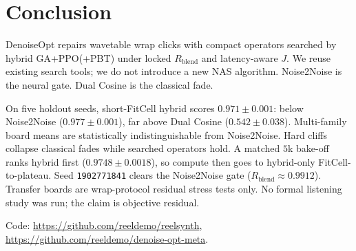 \section{Conclusion}
\label{sec:conclusion}

DenoiseOpt repairs wavetable wrap clicks with compact operators searched by hybrid GA+PPO(+PBT) under locked $R_{\mathrm{blend}}$ and latency-aware $J$.
We reuse existing search tools; we do not introduce a new NAS algorithm.
Noise2Noise is the neural gate. Dual Cosine is the classical fade.

On five holdout seeds, short-FitCell hybrid scores $0.971{\pm}0.001$: below Noise2Noise ($0.977{\pm}0.001$), far above Dual Cosine ($0.542{\pm}0.038$).
Multi-family board means are statistically indistinguishable from Noise2Noise.
Hard cliffs collapse classical fades while searched operators hold.
A matched $5$k bake-off ranks hybrid first ($0.9748{\pm}0.0018$), so compute then goes to hybrid-only FitCell-to-plateau.
Seed \texttt{1902771841} clears the Noise2Noise gate ($R_{\mathrm{blend}}{\approx}0.9912$).
Transfer boards are wrap-protocol residual stress tests only.
No formal listening study was run; the claim is objective residual.

Code: \url{https://github.com/reeldemo/reelsynth}, \url{https://github.com/reeldemo/denoise-opt-meta}.
